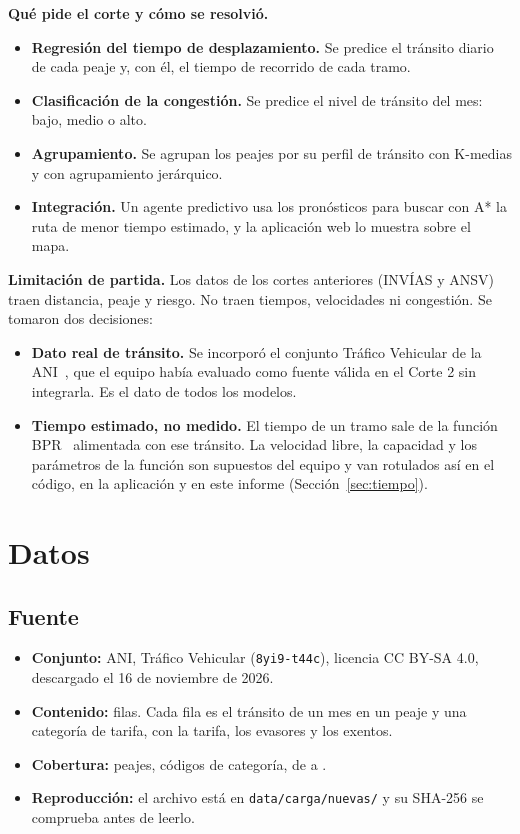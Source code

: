 \documentclass[12pt,a4paper]{article}
\begin{document}
\textbf{Qué pide el corte y cómo se resolvió.}
\begin{itemize}
\item \textbf{Regresión del tiempo de desplazamiento.} Se predice el tránsito
diario de cada peaje y, con él, el tiempo de recorrido de cada tramo.
\item \textbf{Clasificación de la congestión.} Se predice el nivel de
tránsito del mes: bajo, medio o alto.
\item \textbf{Agrupamiento.} Se agrupan los peajes por su perfil de tránsito
con K-medias y con agrupamiento jerárquico.
\item \textbf{Integración.} Un agente predictivo usa los pronósticos para
buscar con A* la ruta de menor tiempo estimado, y la aplicación web lo
muestra sobre el mapa.
\end{itemize}

\textbf{Limitación de partida.} Los datos de los cortes anteriores (INVÍAS y
ANSV) traen distancia, peaje y riesgo. No traen tiempos, velocidades ni
congestión. Se tomaron dos decisiones:
\begin{itemize}
\item \textbf{Dato real de tránsito.} Se incorporó el conjunto Tráfico
Vehicular de la ANI~\cite{ani}, que el equipo había evaluado como fuente
válida en el Corte 2 sin integrarla. Es el dato de todos los modelos.
\item \textbf{Tiempo estimado, no medido.} El tiempo de un tramo sale de la
función BPR~\cite{bpr} alimentada con ese tránsito. La velocidad libre, la
capacidad y los parámetros de la función son supuestos del equipo y van
rotulados así en el código, en la aplicación y en este informe
(Sección~\ref{sec:tiempo}).
\end{itemize}

\section{Datos}
\label{sec:datos}

\subsection{Fuente}

\begin{itemize}
\item \textbf{Conjunto:} ANI, Tráfico Vehicular (\texttt{8yi9-t44c}), licencia
CC BY-SA 4.0, descargado el 16 de noviembre de 2026.
\item \textbf{Contenido:} \ctFilasCrudas{} filas. Cada fila es el tránsito de
un mes en un peaje y una categoría de tarifa, con la tarifa, los evasores y
los exentos.
\item \textbf{Cobertura:} \ctPeajesCrudos{} peajes, \ctCategorias{} códigos de
categoría, de \ctPrimerMes{} a \ctUltimoMes.
\item \textbf{Reproducción:} el archivo está en
\nolinkurl{data/carga/nuevas/} y su SHA-256 se comprueba antes de leerlo.
\end{itemize}
\end{document}
